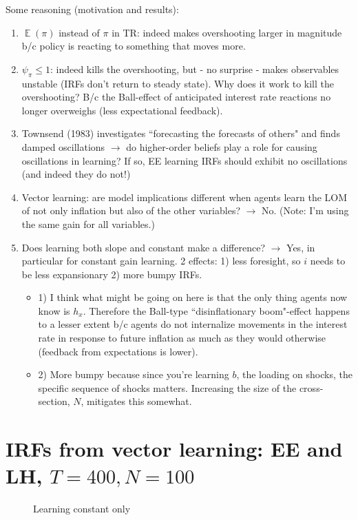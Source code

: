 \documentclass[11pt]{article}
\def \myFigPath {../figures/}
\renewcommand{\[}{\begin{equation}}
\renewcommand{\]}{\end{equation}}
\DeclareMathOperator{\E}{\mathbb{E}}
\def\mySmallerFigScale{0.18}
\begin{document}
Some reasoning (motivation and results):
\begin{enumerate}
\item $\E(\pi)$ instead of $\pi$ in TR: indeed makes overshooting larger in magnitude b/c policy is reacting to something that moves more.
\item $\psi_{\pi} \leq 1$: indeed kills the overshooting, but - no surprise - makes observables unstable (IRFs don't return to steady state). Why does it work to kill the overshooting? B/c the Ball-effect of anticipated interest rate reactions no longer overweighs (less expectational feedback).
\item Townsend (1983) investigates ``forecasting the forecasts of others" and finds damped oscillations $\rightarrow$ do higher-order beliefs play a role for causing oscillations in learning? If so, EE learning IRFs should exhibit no oscillations (and indeed they do not!)
\item Vector learning: are model implications different when agents learn the LOM of not only inflation but also of the other variables? $\rightarrow$ No. (Note: I'm using the same gain for all variables.)
\item Does learning both slope and constant make a difference? $\rightarrow$ Yes, in particular for constant gain learning. 2 effects: 1) less foresight, so $i$ needs to be less expansionary 2) more bumpy IRFs.
\begin{itemize}
\item[] 1) I think what might be going on here is that the only thing agents now know is $h_x$. Therefore the Ball-type ``disinflationary boom"-effect happens to a lesser extent b/c agents do not internalize movements in the interest rate in response to future inflation as much as they would otherwise (feedback from expectations is lower).
\item[] 2) More bumpy because since you're learning $b$, the loading on shocks, the specific sequence of shocks matters. Increasing the size of the cross-section, $N$, mitigates this somewhat. 
\end{itemize}
\end{enumerate}


\newpage
\section{IRFs from vector learning: EE and LH, $T=400, N=100$}
\begin{figure}[h!]
\caption{Learning constant only}
\end{figure}
\end{document}
